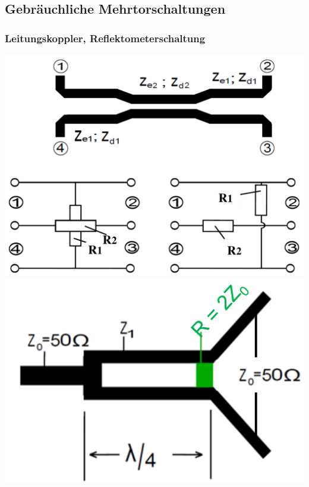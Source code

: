 {\subsection{Gebräuchliche Mehrtorschaltungen}
\subsubsection{Leitungskoppler, Reflektometerschaltung}
\begin{minipage}{.4\paperheight}
    \includegraphics[width=.12\paperheight]{content/fuw/pictures/fuw_leitungs_und_resistive_koppler.png}
    \includegraphics[width=.12\paperheight]{content/fuw/pictures/fuw_wilkinsonteiler1.png}

\end{minipage}}
